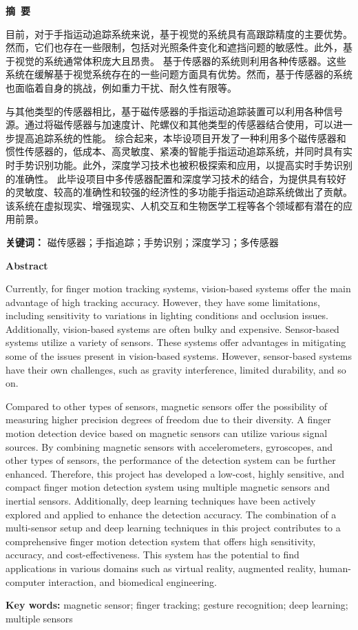 \cleardoublepage{}
\begin{center}
    \bfseries {} 摘~要
\end{center}

目前，对于手指运动追踪系统来说，基于视觉的系统具有高跟踪精度的主要优势。然而，它们也存在一些限制，包括对光照条件变化和遮挡问题的敏感性。此外，基于视觉的系统通常体积庞大且昂贵。
基于传感器的系统则利用各种传感器。这些系统在缓解基于视觉系统存在的一些问题方面具有优势。然而，基于传感器的系统也面临着自身的挑战，例如重力干扰、耐久性有限等。

与其他类型的传感器相比，基于磁传感器的手指运动追踪装置可以利用各种信号源。通过将磁传感器与加速度计、陀螺仪和其他类型的传感器结合使用，可以进一步提高追踪系统的性能。
综合起来，本毕设项目开发了一种利用多个磁传感器和惯性传感器的，低成本、高灵敏度、紧凑的智能手指运动追踪系统，并同时具有实时手势识别功能。此外，深度学习技术也被积极探索和应用，以提高实时手势识别的准确性。
此毕设项目中多传感器配置和深度学习技术的结合，为提供具有较好的灵敏度、较高的准确性和较强的经济性的多功能手指运动追踪系统做出了贡献。该系统在虚拟现实、增强现实、人机交互和生物医学工程等各个领域都有潜在的应用前景。

{\noindent \textbf{关键词：} 磁传感器；手指追踪；手势识别；深度学习；多传感器}

\cleardoublepage{}
\begin{center}
    \bfseries {} Abstract
\end{center}

Currently, for finger motion tracking systems, vision-based systems offer the main advantage of high tracking accuracy. However, they have some limitations, including sensitivity to variations in lighting conditions and occlusion issues. 
Additionally, vision-based systems are often bulky and expensive.
Sensor-based systems utilize a variety of sensors. These systems offer advantages in mitigating some of the issues present in vision-based systems.
However, sensor-based systems have their own challenges, such as gravity interference, limited durability, and so on.

Compared to other types of sensors, magnetic sensors offer the possibility of measuring higher precision degrees of freedom due to their diversity. A finger motion detection device based on magnetic sensors can utilize various signal sources.
By combining magnetic sensors with accelerometers, gyroscopes, and other types of sensors, the performance of the detection system can be further enhanced.
Therefore, this project has developed a low-cost, highly sensitive, and compact finger motion detection system using multiple magnetic sensors and inertial sensors. Additionally, deep learning techniques have been actively explored and applied to enhance the detection accuracy.
The combination of a multi-sensor setup and deep learning techniques in this project contributes to a comprehensive finger motion detection system that offers high sensitivity, accuracy, and cost-effectiveness. This system has the potential to find applications in various domains such as virtual reality, augmented reality, human-computer interaction, and biomedical engineering.

{\noindent \textbf{Key words:} magnetic sensor; finger tracking; gesture recognition; deep learning; multiple sensors}